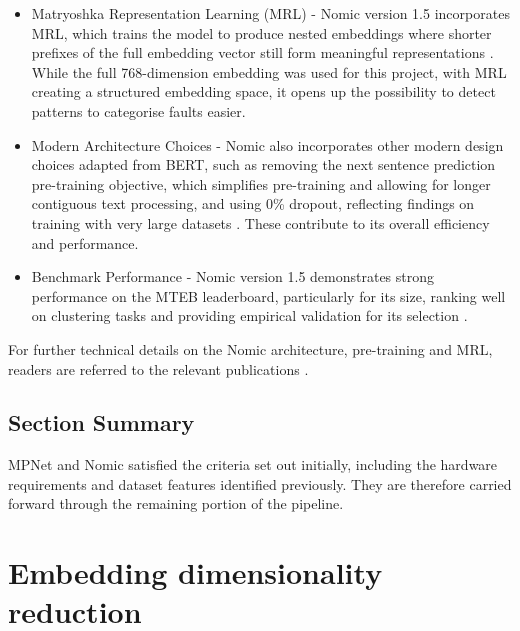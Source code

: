 \documentclass[10pt,oneside]{report}
\begin{document}
\begin{itemize}
    \item Matryoshka Representation Learning (MRL) - Nomic version 1.5 incorporates MRL, which trains the model to produce nested embeddings where shorter prefixes of the full embedding vector still form meaningful representations \cite{kusupati2022matryoshka, nussbaum2024nomic1.5}. While the full 768-dimension embedding was used for this project, with MRL creating a structured embedding space, it opens up the possibility to detect patterns to categorise faults easier.
    \item Modern Architecture Choices - Nomic also incorporates other modern design choices adapted from BERT, such as removing the next sentence prediction pre-training objective, which simplifies pre-training and allowing for longer contiguous text processing, and using 0\% dropout, reflecting findings on training with very large datasets \cite{nussbaum2024nomic, liu2019roberta, xue2023repeat}. These contribute to its overall efficiency and performance.
    \item Benchmark Performance - Nomic version 1.5 demonstrates strong performance on the MTEB leaderboard, particularly for its size, ranking well on clustering tasks and providing empirical validation for its selection \cite{muennighoff2022mteb, nussbaum2024nomicelo}.
\end{itemize}

For further technical details on the Nomic architecture, pre-training and MRL, readers are referred to the relevant publications \cite{nussbaum2024nomic, nussbaum2024nomic1.5, kusupati2022matryoshka}.


\subsection {Section Summary}
MPNet and Nomic satisfied the criteria set out initially, including the hardware requirements and dataset features identified previously. They are therefore carried forward through the remaining portion of the pipeline. 

\section{Embedding dimensionality reduction}

\end{document}
